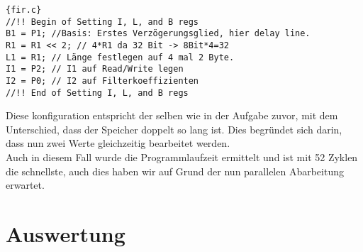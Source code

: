 \begin{adjustbox}{width=\textwidth,height=\textheight,keepaspectratio}
 \begin{lstlisting}[title=fir.c]{fir.c}
//!! Begin of Setting I, L, and B regs	
B1 = P1; //Basis: Erstes Verzögerungsglied, hier delay line.
R1 = R1 << 2; // 4*R1 da 32 Bit -> 8Bit*4=32
L1 = R1; // Länge festlegen auf 4 mal 2 Byte.
I1 = P2; // I1 auf Read/Write legen
I2 = P0; // I2 auf Filterkoeffizienten
//!! End of Setting I, L, and B regs
\end{lstlisting}
\end{adjustbox}
Diese konfiguration entspricht der selben wie in der Aufgabe zuvor, mit dem Unterschied, dass der Speicher doppelt so lang ist. Dies begr\"undet sich darin, dass nun zwei Werte gleichzeitig bearbeitet werden.\\
Auch in diesem Fall wurde die Programmlaufzeit ermittelt und ist mit 52 Zyklen die schnellste, auch dies haben wir auf Grund der nun parallelen Abarbeitung erwartet.



\section{Auswertung}
